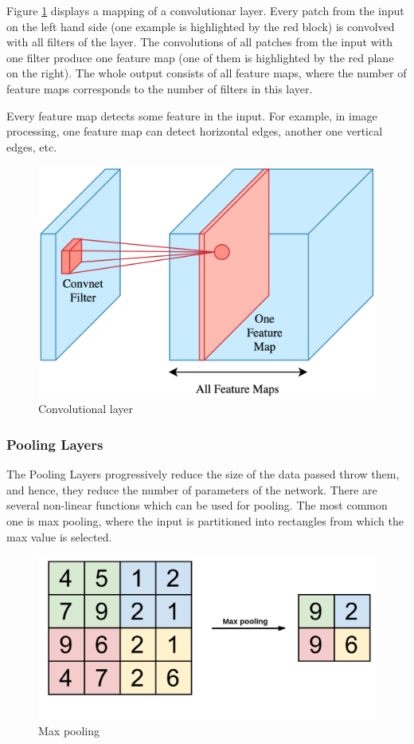 Figure \ref{fig:ConvNN} displays a mapping of a convolutionar layer. 
Every patch from the input on the left hand side (one example is highlighted by the red block) is convolved with all filters of the layer. The convolutions of all patches from the input with one filter produce one feature map (one of them is highlighted by the red plane on the right). The whole output consists of all feature maps, where the number of feature maps corresponds to the number of filters in this layer.

Every feature map detects some feature in the input. For example, in image processing, one feature map can detect horizontal edges, another one vertical edges, etc.

\begin{figure}[h!]
    \centering
    \includegraphics[scale=0.2]{figures/convNN.png}
    \caption{Convolutional layer \cite{ConvNN_layer_img}}
    \label{fig:ConvNN}
\end{figure}

\subsubsection{Pooling Layers}
The Pooling Layers progressively reduce the size of the data passed throw them, and hence, they reduce the number of parameters of the network. There are several non-linear functions which can be used for pooling. The most common one is max pooling, where the input is partitioned into rectangles from which the max value is selected. 

\begin{figure}[h!]
    \centering
    \includegraphics[scale=0.2]{figures/max_pooling.png}
    \caption{Max pooling}
    \label{fig:maxPooling}
\end{figure}

